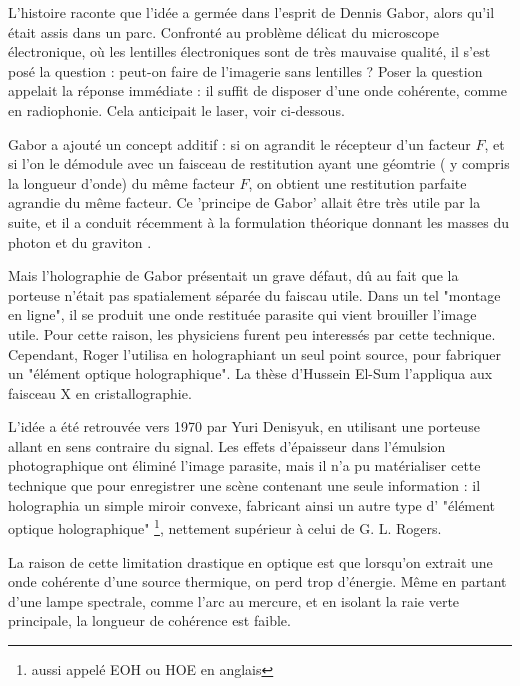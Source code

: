 \documentclass[a4paper,12pt]{article}
\begin{document}
L'histoire raconte que l'idée a germée dans l'esprit de Dennis Gabor, alors qu'il était assis dans un parc. Confronté au problème délicat du microscope électronique, où les lentilles électroniques sont de très mauvaise qualité, il s'est posé la question : peut-on faire de l'imagerie sans lentilles ? Poser la question appelait la réponse immédiate : il suffit de disposer d'une onde cohérente, comme en radiophonie. Cela anticipait le laser, voir ci-dessous.


Gabor a ajouté un concept additif : si on agrandit le récepteur d'un facteur $F$, et si l'on le démodule avec un faisceau de restitution ayant une géomtrie ( y compris la longueur d'onde) du même facteur $F$, on obtient une restitution parfaite agrandie du même facteur. Ce 'principe de Gabor' allait être très utile par la suite, et il a conduit récemment à la formulation théorique donnant les masses du photon et du graviton \cite{Sanchez}.



Mais l'holographie de Gabor présentait un grave défaut, dû au fait que la porteuse n'était pas spatialement séparée du faiscau utile. Dans un tel "montage en ligne", il se produit une onde restituée parasite qui vient brouiller l'image utile. Pour cette raison, les physiciens furent peu interessés par cette technique. Cependant, Roger l'utilisa en holographiant un seul point source, pour fabriquer un "élément optique holographique". La thèse d'Hussein El-Sum l'appliqua aux faisceau X en cristallographie. 


L'idée a été retrouvée vers 1970 par Yuri Denisyuk, en utilisant une porteuse allant en sens contraire du signal. Les effets d'épaisseur dans l'émulsion photographique ont éliminé l'image parasite, mais il n'a pu matérialiser cette technique que pour enregistrer une scène contenant une seule information : il holographia un simple miroir convexe, fabricant ainsi un autre type d' "élément optique holographique" \footnote{aussi appelé EOH ou HOE en anglais}, nettement supérieur à celui de G. L. Rogers.


La raison de cette limitation drastique en optique est que lorsqu'on extrait une onde cohérente d'une source thermique, on perd trop d'énergie. Même en partant d'une lampe spectrale, comme l'arc au mercure, et en isolant la raie verte principale, la longueur de cohérence est faible. 
\end{document}
